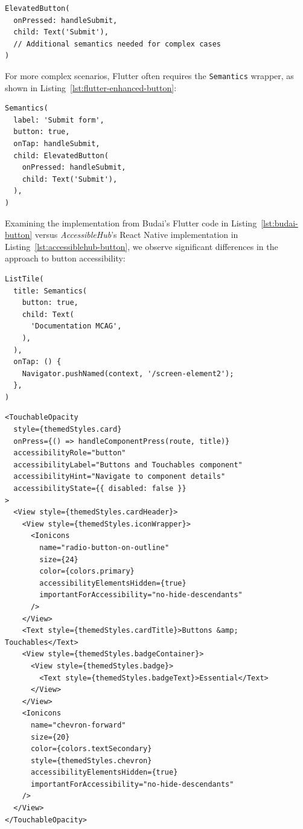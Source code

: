 {\begin{lstlisting}[style=DartStyle, caption=Accessible button in Flutter, label=lst:flutter-button]
ElevatedButton(
  onPressed: handleSubmit,
  child: Text('Submit'),
  // Additional semantics needed for complex cases
)
\end{lstlisting}

For more complex scenarios, Flutter often requires the \texttt{Semantics} wrapper, as shown in Listing~\ref{lst:flutter-enhanced-button}:

\begin{lstlisting}[style=DartStyle, caption=Enhanced button accessibility in Flutter, label=lst:flutter-enhanced-button]
Semantics(
  label: 'Submit form',
  button: true,
  onTap: handleSubmit,
  child: ElevatedButton(
    onPressed: handleSubmit,
    child: Text('Submit'),
  ),
)
\end{lstlisting}

\pagebreak

Examining the implementation from Budai's Flutter code in Listing~\ref{lst:budai-button} versus \textit{AccessibleHub}'s React Native implementation in Listing~\ref{lst:accessiblehub-button}, we observe significant differences in the approach to button accessibility:

\begin{lstlisting}[style=DartStyle, caption=Budai's Flutter implementation of accessible buttons, label=lst:budai-button]
ListTile(
  title: Semantics(
    button: true,
    child: Text(
      'Documentation MCAG',
    ),
  ),
  onTap: () {
    Navigator.pushNamed(context, '/screen-element2');
  },
)
\end{lstlisting}

\FloatBarrier

\begin{lstlisting}[style=ReactNativeStyle, caption=\textit{AccessibleHub}'s React Native implementation of accessible buttons, label=lst:accessiblehub-button]
<TouchableOpacity
  style={themedStyles.card}
  onPress={() => handleComponentPress(route, title)}
  accessibilityRole="button"
  accessibilityLabel="Buttons and Touchables component"
  accessibilityHint="Navigate to component details"
  accessibilityState={{ disabled: false }}
>
  <View style={themedStyles.cardHeader}>
    <View style={themedStyles.iconWrapper}>
      <Ionicons
        name="radio-button-on-outline"
        size={24}
        color={colors.primary}
        accessibilityElementsHidden={true}
        importantForAccessibility="no-hide-descendants"
      />
    </View>
    <Text style={themedStyles.cardTitle}>Buttons &amp; Touchables</Text>
    <View style={themedStyles.badgeContainer}>
      <View style={themedStyles.badge}>
        <Text style={themedStyles.badgeText}>Essential</Text>
      </View>
    </View>
    <Ionicons
      name="chevron-forward"
      size={20}
      color={colors.textSecondary}
      style={themedStyles.chevron}
      accessibilityElementsHidden={true}
      importantForAccessibility="no-hide-descendants"
    />
  </View>
</TouchableOpacity>
\end{lstlisting}

}
